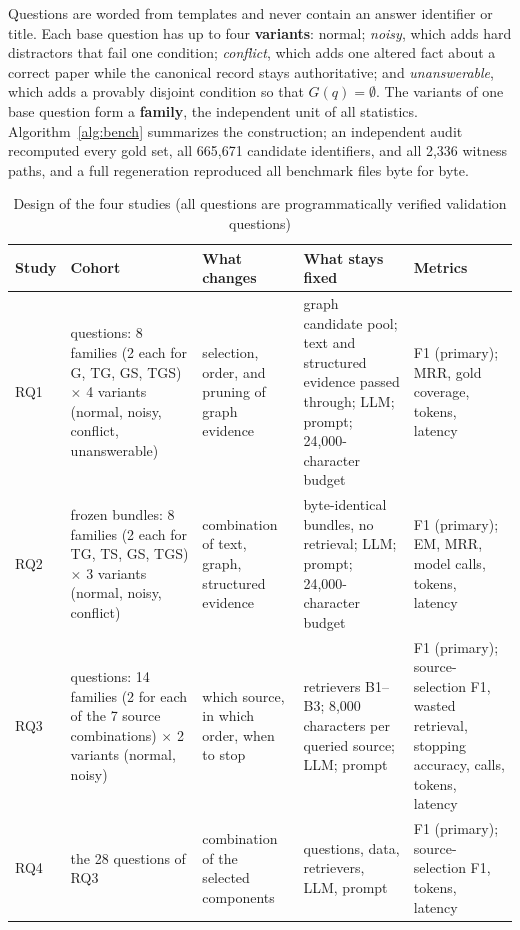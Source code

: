 \documentclass[conference]{IEEEtran}
\begin{document}
Questions are worded from templates and never contain an answer identifier or title. Each base question has up to four \textbf{variants}: normal; \emph{noisy}, which adds hard distractors that fail one condition; \emph{conflict}, which adds one altered fact about a correct paper while the canonical record stays authoritative; and \emph{unanswerable}, which adds a provably disjoint condition so that $G(q)=\emptyset$. The variants of one base question form a \textbf{family}, the independent unit of all statistics. Algorithm~\ref{alg:bench} summarizes the construction; an independent audit recomputed every gold set, all 665,671 candidate identifiers, and all 2,336 witness paths, and a full regeneration reproduced all benchmark files byte for byte.

\begin{table}[!t]
\caption{Design of the four studies (all questions are programmatically verified validation questions)}
\label{tab:design}
\centering
\footnotesize
\setlength{\tabcolsep}{3pt}
\renewcommand{\arraystretch}{1.1}
\begin{tabular}{@{}>{\raggedright\arraybackslash}p{}>{\raggedright\arraybackslash}p{}>{\raggedright\arraybackslash}p{}>{\raggedright\arraybackslash}p{}>{\raggedright\arraybackslash}p{}@{}}
\toprule
\textbf{Study} & \textbf{Cohort} & \textbf{What changes} & \textbf{What stays fixed} & \textbf{Metrics} \\
\midrule
RQ1 & 32 questions: 8 families (2 each for G, TG, GS, TGS) $\times$ 4 variants (normal, noisy, conflict, unanswerable) & selection, order, and pruning of graph evidence & graph candidate pool; text and structured evidence passed through; LLM; prompt; 24,000-character budget & F1 (primary); MRR, gold coverage, tokens, latency \\
RQ2 & 24 frozen bundles: 8 families (2 each for TG, TS, GS, TGS) $\times$ 3 variants (normal, noisy, conflict) & combination of text, graph, structured evidence & byte-identical bundles, no retrieval; LLM; prompt; 24,000-character budget & F1 (primary); EM, MRR, model calls, tokens, latency \\
RQ3 & 28 questions: 14 families (2 for each of the 7 source combinations) $\times$ 2 variants (normal, noisy) & which source, in which order, when to stop & retrievers B1--B3; 8,000 characters per queried source; LLM; prompt & F1 (primary); source-selection F1, wasted retrieval, stopping accuracy, calls, tokens, latency \\
RQ4 & the 28 questions of RQ3 & combination of the selected components & questions, data, retrievers, LLM, prompt & F1 (primary); source-selection F1, tokens, latency \\
\bottomrule
\end{tabular}
\end{table}
\end{document}

